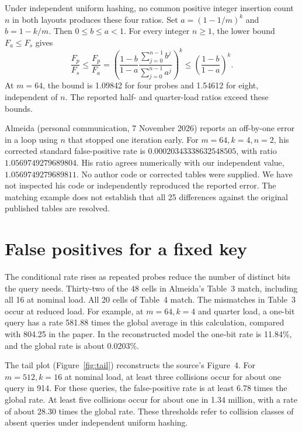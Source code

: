 Under independent uniform hashing, no common positive integer insertion
count $n$ in both layouts produces these four ratios. Set
$a=(1-1/m)^k$ and $b=1-k/m$. Then $0\le b\le a<1$.
For every integer $n\ge1$, the lower bound $F_a\le F_s$ gives
\[
  \frac{F_p}{F_s}
  \le \frac{F_p}{F_a}
  =\left(\frac{1-b}{1-a}
     \frac{\sum_{j=0}^{n-1} b^j}{\sum_{j=0}^{n-1} a^j}\right)^k
  \le \left(\frac{1-b}{1-a}\right)^k.
\]
At $m=64$, the bound is 1.09842 for four probes and 1.54612 for eight,
independent of $n$. The reported half- and quarter-load ratios exceed
these bounds.

Almeida (personal communication, 7 November 2026) reports an off-by-one
error in a loop using $n$ that stopped one iteration early. For
$m=64,k=4,n=2$, his corrected standard false-positive rate is
$0.00020343338632548505$, with ratio $1.0569749279689804$.
His ratio agrees numerically with our independent value,
$1.0569749279689811$. No author code or corrected tables were supplied.
We have not inspected his code or independently reproduced the reported error.
The matching example does not establish that all 25 differences against the
original published tables are resolved.

\section{False positives for a fixed key}
\label{sec:fixed}

The conditional rate rises as repeated probes reduce the number of
distinct bits the query needs. Thirty-two of the 48 cells in Almeida's
Table~3 match, including all 16 at nominal load. All 20 cells of
Table~4 match. The mismatches in Table~3 occur at reduced load. For
example, at $m=64,k=4$ and quarter load, a one-bit query has a rate
581.88 times the global average in this calculation, compared with
804.25 in the paper. In the reconstructed model the one-bit rate is
11.84\%, and the global rate is about 0.0203\%.

The tail plot (Figure~\ref{fig:tail}) reconstructs the source's
Figure~4. For $m=512,k=16$ at nominal load, at least three collisions
occur for about one query in 914. For these queries, the false-positive
rate is at least 6.78 times the global rate. At least five collisions
occur for about one in 1.34 million, with a rate of about 28.30 times
the global rate. These thresholds refer to collision classes of absent
queries under independent uniform hashing.



